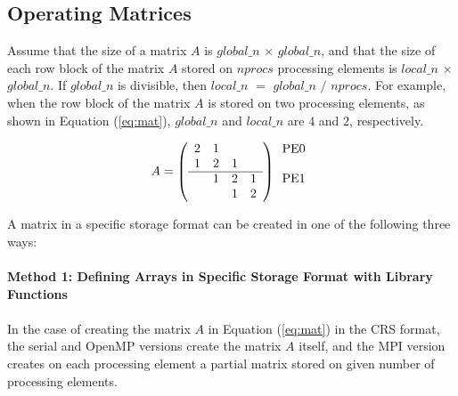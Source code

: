 \documentclass[a4paper]{article}
\begin{document}
\subsection{Operating Matrices}
Assume that the size of a matrix $A$ is 
$global\_n$ $\times$ $global\_n$, and that the size of each row block
of the matrix $A$ stored on $nprocs$ processing elements is 
$local\_n$ $\times$ $global\_n$. 
If $global\_n$ is divisible, 
then $local\_n$ $=$ $global\_n$ $/$ $nprocs$. 
For example, when the row block of the matrix $A$ is stored on two
processing elements, 
as shown in Equation (\ref{eq:mat}), $global\_n$ and $local\_n$ 
are $4$ and $2$, respectively.

\begin{equation}
\label{eq:mat}
A = 
\left(
\begin{array}{cccc}
2 & 1 &   &    \\
1 & 2 & 1 &    \\ \hline
  & 1 & 2 & 1 \\
  &   & 1 & 2 
\end{array}
\right)
\begin{array}{l}
\mbox{PE0} \\
    \\
\mbox{PE1} \\
   \\ 
\end{array}
\end{equation}

A matrix in a specific storage format can be created in one of the
following three ways:\\ \\
\noindent
{\bf Method 1: Defining Arrays in Specific Storage Format with Library Functions}
\\ \\
\indent
In the case of creating the matrix $A$ in Equation (\ref{eq:mat}) 
in the CRS format, the serial and OpenMP versions create 
the matrix $A$ itself, and the MPI version creates on each processing element a partial matrix 
stored on given number of processing elements. 
\end{document}
